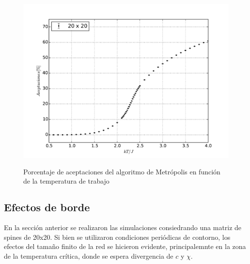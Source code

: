 \documentclass[a4paper,12pt]{article}
\begin{document}
\begin{figure}[H]
    \begin{center}
      \includegraphics[scale=0.5]{aceptaciones.pdf} \\
      \caption{Porcentaje de aceptaciones del algoritmo de Metrópolis en 
      función de la temperatura de trabajo}\label{fig:aceptaciones}
    \end{center}
\end{figure}

\subsection{Efectos de borde}

En la sección anterior se realizaron las simulaciones consiedrando una matriz 
de spines de 20x20. Si bien se utilizaron condiciones periódicas de contorno, 
los efectos del tamaño finito de la red se hicieron evidente, principalemnte en 
la zona de la temperatura crítica, donde se espera divergencia de $c$ y $\chi$.
\end{document}
